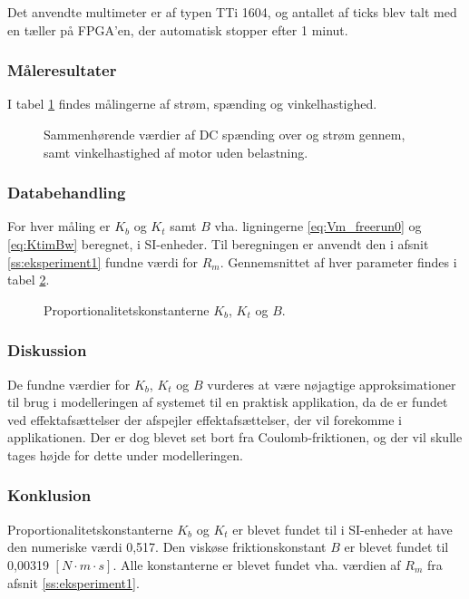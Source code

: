 Det anvendte multimeter er af typen TTi 1604,
og antallet af ticks blev talt med en tæller på FPGA'en, der automatisk stopper efter 1 minut.
\subsubsection{Måleresultater}
I tabel \ref{tb:steadystatenoload} findes målingerne af strøm, spænding og vinkelhastighed.
\begin{figure}[th!]
	\centering
	
	\captionsetup{type=table}
	\caption[Steady-state spænding, strøm og vinkelhastighed uden belastning]
			{Sammenhørende værdier af DC spænding over og strøm gennem, samt vinkelhastighed af motor uden belastning.}
	\label{tb:steadystatenoload}
\end{figure}
\subsubsection{Databehandling}
For hver måling er \(K_b\) og \(K_t\) samt \(B\) vha. ligningerne \ref{eq:Vm_freerun0} og \ref{eq:KtimBw} beregnet,
i SI-enheder. Til beregningen er anvendt den i afsnit \ref{ss:eksperiment1} fundne værdi for \(R_m\).
Gennemsnittet af hver parameter findes i tabel \ref{tb:kbktb}.
\begin{figure}[th!]
	\centering
	
	\captionsetup{type=table}

	\caption[Proportionalitetskonstanterne]
			{Proportionalitetskonstanterne \(K_b\), \(K_t\) og \(B\).}
	\label{tb:kbktb}
\end{figure}

\subsubsection{Diskussion}
De fundne værdier for \(K_b\), \(K_t\) og \(B\) vurderes at være nøjagtige approksimationer
til brug i modelleringen af systemet til en praktisk applikation, da de er fundet ved effektafsættelser
der afspejler effektafsættelser, der vil forekomme i applikationen.
Der er dog blevet set bort fra Coulomb-friktionen, og der vil skulle tages højde for dette under modelleringen.
\subsubsection{Konklusion}
Proportionalitetskonstanterne \(K_b\) og \(K_t\) er blevet fundet til i SI-enheder at have den numeriske værdi 0,517.
Den viskøse friktionskonstant \(B\) er blevet fundet til 0,00319 \([N \cdot m \cdot s]\).
Alle konstanterne er blevet fundet vha. værdien af \(R_m\) fra afsnit \ref{ss:eksperiment1}.
